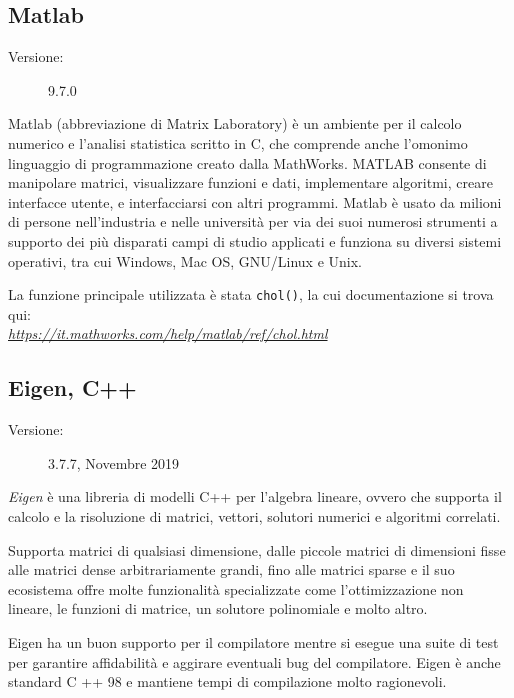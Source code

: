 \documentclass[preprint,12pt]{elsarticle}
\begin{document}
\subsection*{Matlab}
\medskip
\begin{description}
	\item[Versione:] 9.7.0
\end{description}

Matlab (abbreviazione di Matrix Laboratory) è un ambiente per il calcolo numerico e l'analisi statistica scritto in C, che comprende anche l'omonimo linguaggio di programmazione creato dalla MathWorks. MATLAB consente di manipolare matrici, visualizzare funzioni e dati, implementare algoritmi, creare interfacce utente, e interfacciarsi con altri programmi. Matlab è usato da milioni di persone nell'industria e nelle università per via dei suoi numerosi strumenti a supporto dei più disparati campi di studio applicati e funziona su diversi sistemi operativi, tra cui Windows, Mac OS, GNU/Linux e Unix.

La funzione principale utilizzata è stata \texttt{chol()}, la cui documentazione si trova qui:\\
\textit{\href{https://it.mathworks.com/help/matlab/ref/chol.html}{https://it.mathworks.com/help/matlab/ref/chol.html}}

\subsection*{Eigen, C++}
\medskip
\begin{description}
	\item[Versione:] 3.7.7, Novembre 2019
\end{description}

\textit{Eigen} è una libreria di modelli C++ per l'algebra lineare, ovvero che supporta il calcolo e la risoluzione di matrici, vettori, solutori numerici e algoritmi correlati.

Supporta matrici di qualsiasi dimensione, dalle piccole matrici di dimensioni fisse alle matrici dense arbitrariamente grandi, fino alle matrici sparse e il suo ecosistema offre molte funzionalità specializzate come l'ottimizzazione non lineare, le funzioni di matrice, un solutore polinomiale e molto altro.

Eigen ha un buon supporto per il compilatore mentre si esegue una suite di test per garantire affidabilità e aggirare eventuali bug del compilatore. Eigen è anche standard C ++ 98 e mantiene tempi di compilazione molto ragionevoli.
\end{document}
